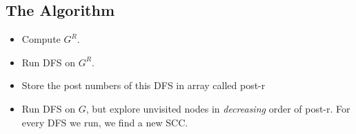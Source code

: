 	\subsection{The Algorithm}
	\begin{itemize}
		\item Compute $G^R$.
		\item Run DFS on $G^R$.
		\item Store the post numbers of this DFS in array called post-r 
		\item Run DFS on $G$, but explore unvisited nodes in \textit{decreasing} order of post-r. For every 
			DFS we run, we find a new SCC.
	\end{itemize}